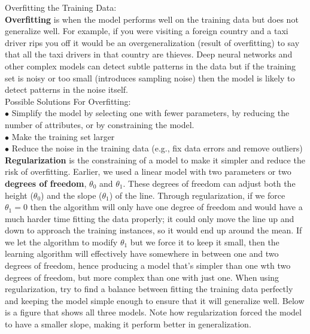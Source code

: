     \noindent Overfitting the Training Data: \\
    \textbf{Overfitting} is when the model performs well on the training data but does not generalize well.
    For example, if you were visiting a foreign country and a taxi driver rips you off it would be an
    overgeneralization (result of overfitting) to say that all the taxi drivers in that country are thieves.
    Deep neural networks and other complex models can detect subtle patterns in the data but if the training
    set is noisy or too small (introduces sampling noise) then the model is likely to detect patterns in the
    noise itself. \\

    \noindent Possible Solutions For Overfitting: \\
    $\bullet$ Simplify the model by selecting one with fewer parameters, by reducing the number of attributes,
    or by constraining the model. \\
    $\bullet$ Make the training set larger \\
    $\bullet$ Reduce the noise in the training data (e.g., fix data errors and remove outliers) \\

    \noindent \textbf{Regularization} is the constraining of a model to make it simpler and reduce the risk of
    overfitting. Earlier, we used a linear model with two parameters or two \textbf{degrees of freedom},
    $\theta_0$ and $\theta_1$. These degrees of freedom can adjust both the height ($\theta_0$) and the
    slope ($\theta_1$) of the line. Through regularization, if we force $\theta_1 = 0$ then the algorithm
    will only have one degree of freedom and would have a much harder time fitting the data properly; it could
    only move the line up and down to approach the training instances, so it would end up around the mean.
    If we let the algorithm to modify $\theta_1$ but we force it to keep it small, then the learning algorithm
    will effectively have somewhere in between one and two degrees of freedom, hence producing a model that's
    simpler than one wth two degrees of freedom, but more complex than one with just one. When using
    regularization, try to find a balance between fitting the training data perfectly and keeping the model
    simple enough to ensure that it will generalize well. Below is a figure that shows all three models. Note
    how regularization forced the model to have a smaller slope, making it perform better in generalization.

